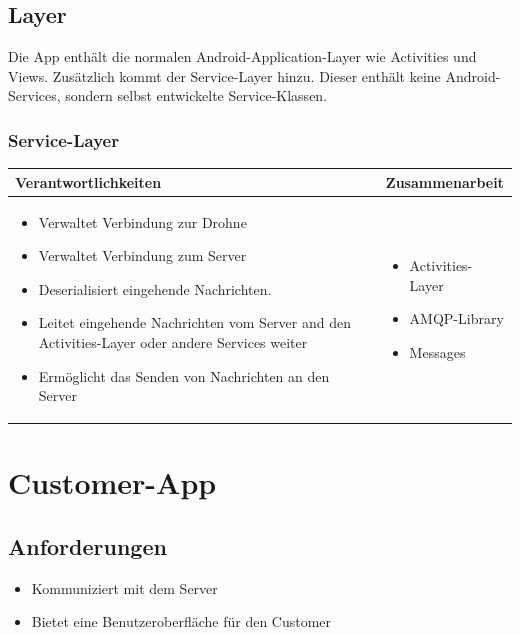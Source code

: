 \subsection{Layer}

Die App enthält die normalen Android-Application-Layer wie Activities und Views. Zusätzlich kommt der Service-Layer hinzu. Dieser enthält keine Android-Services, sondern selbst entwickelte Service-Klassen.

\subsubsection{Service-Layer}

\begin{tabular}{|p{}|p{}|} \hline
	\textbf{Verantwortlichkeiten} & \textbf{Zusammenarbeit} \\ \hline \hline
	
	\begin{itemize}
		\item Verwaltet Verbindung zur Drohne
		\item Verwaltet Verbindung zum Server
		\item Deserialisiert eingehende Nachrichten.
		\item Leitet eingehende Nachrichten vom Server and den Activities-Layer oder andere Services weiter
		\item Ermöglicht das Senden von Nachrichten an den Server
	\end{itemize}&
	\begin{itemize}
		\item Activities-Layer
		\item AMQP-Library
		\item Messages
	\end{itemize}
	\\ \hline
\end{tabular}


\section{Customer-App}

\subsection{Anforderungen}

\begin{itemize}
	\item Kommuniziert mit dem Server
	\item Bietet eine Benutzeroberfläche für den Customer
\end{itemize}

